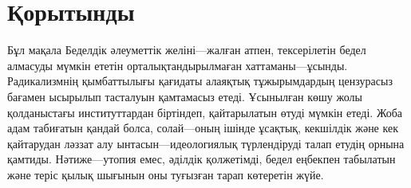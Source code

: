 \documentclass[11pt,a4paper,twocolumn]{article}
\begin{document}
\section{Қорытынды}

Бұл мақала Беделдік әлеуметтік желіні---жалған атпен, тексерілетін бедел алмасуды мүмкін ететін орталықтандырылмаған хаттаманы---ұсынды. Радикализмнің қымбаттылығы қағидаты алаяқтық тұжырымдардың цензурасыз бағамен ысырылып тасталуын қамтамасыз етеді. Ұсынылған көшу жолы қолданыстағы институттардан біртіндеп, қайтарылатын өтуді мүмкін етеді. Жоба адам табиғатын қандай болса, солай---оның ішінде ұсақтық, кекшілдік және кек қайтарудан ләззат алу ынтасын---идеологиялық түрлендіруді талап етудің орнына қамтиды. Нәтиже---утопия емес, әділдік қолжетімді, бедел еңбекпен табылатын және теріс қылық шығынын оны туғызған тарап көтеретін жүйе.


\end{document}
